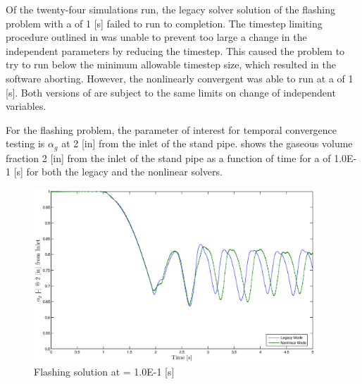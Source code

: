 Of the twenty-four simulations run, the legacy solver solution of the flashing problem with a \dtmax{} of 1 [s] failed to run to completion.
The timestep limiting procedure outlined in   was unable to prevent too large a change in the independent parameters by reducing the timestep.
This caused the problem to try to run below the minimum allowable timestep size, which resulted in the software aborting.
However, the nonlinearly convergent \cobra{} was able to run at a \dtmax{} of 1 [s].
Both versions of \cobra{} are subject to the same limits on change of independent variables.

For the flashing problem, the parameter of interest for temporal convergence testing is $\alpha_g$ at 2 [in] from the inlet of the stand pipe.
 shows the gaseous volume fraction 2 [in] from the inlet of the stand pipe as a function of time for a \dtmax{} of 1.0E-1 [s] for both the legacy and the nonlinear solvers.


\begin{figure}[h!t]
\centering
\includegraphics[width=0.94\textwidth]{images/flashing_1em1.eps}
\caption{Flashing solution at \dtmax{} = 1.0E-1 {[s]}}
\label{fig:flashing_1em1}
\end{figure}

